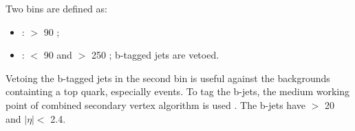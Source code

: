Two bins are defined as:
\begin{itemize}
\item {\bf\binone}: \mttwo $>$ 90 \GeV;
\item {\bf\bintwo}: \mttwo $<$ 90 \GeV and \SumMT $>$ 250 \GeV; b-tagged jets are vetoed.
\end{itemize}
Vetoing the b-tagged jets in the second bin is useful against the backgrounds containting a top quark, especially \ttbar events. 
To tag the b-jets, the medium working point of combined secondary vertex algorithm is used \cite{Chatrchyan:2012jua}. The b-jets have
\PT $>$ 20 \GeV and $|\eta| < $ 2.4.


